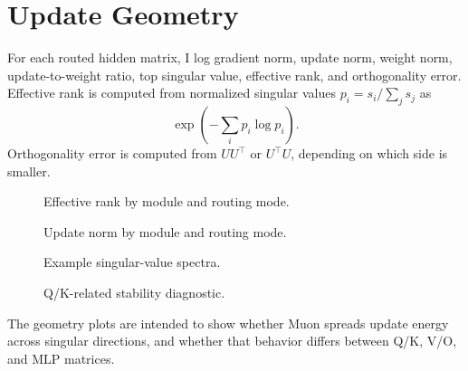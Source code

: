 \section{Update Geometry}

For each routed hidden matrix, I log gradient norm, update norm, weight norm, update-to-weight ratio, top singular value, effective rank, and orthogonality error. Effective rank is computed from normalized singular values \(p_i=s_i/\sum_j s_j\) as
\[
\exp\left(-\sum_i p_i \log p_i\right).
\]
Orthogonality error is computed from \(UU^\top\) or \(U^\top U\), depending on which side is smaller.

\begin{figure}[ht]
\centering
{}
\caption{Effective rank by module and routing mode.}
\end{figure}

\begin{figure}[ht]
\centering
{}
\caption{Update norm by module and routing mode.}
\end{figure}

\begin{figure}[ht]
\centering
{}
\caption{Example singular-value spectra.}
\end{figure}

\begin{figure}[ht]
\centering
{}
\caption{Q/K-related stability diagnostic.}
\end{figure}

\FloatBarrier

The geometry plots are intended to show whether Muon spreads update energy across singular directions, and whether that behavior differs between Q/K, V/O, and MLP matrices.
